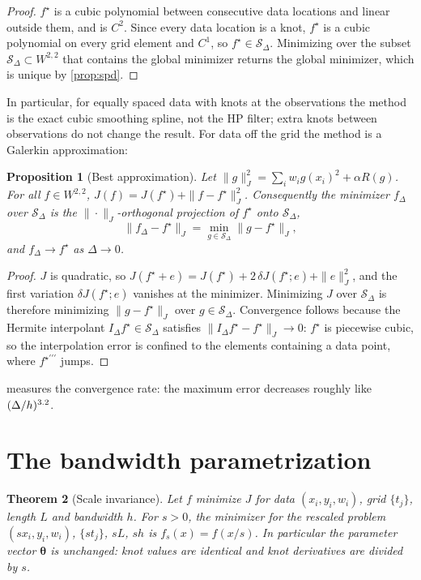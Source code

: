 \documentclass[11pt,a4paper]{article}
\newtheorem{theorem}{Theorem}
\newtheorem{proposition}[theorem]{Proposition}
\theoremstyle{definition}
\theoremstyle{remark}
\newcommand{\vth}{\boldsymbol{\theta}}
\newcommand{\Sd}{\mathcal{S}_\Delta}
\begin{document}
\begin{proof}
$f^\star$ is a cubic polynomial between consecutive data locations and linear outside them, and is $C^2$. Since every data location is a knot, $f^\star$ is a cubic polynomial on every grid element and $C^1$, so $f^\star\in\Sd$. Minimizing over the subset $\Sd\subset W^{2,2}$ that contains the global minimizer returns the global minimizer, which is unique by \cref{prop:spd}.
\end{proof}

In particular, for equally spaced data with knots at the observations the method is the exact cubic smoothing spline, not the HP filter; extra knots between observations do not change the result. For data off the grid the method is a Galerkin approximation:

\begin{proposition}[Best approximation]
\label{prop:galerkin}
Let $\|g\|_J^2=\sum_iw_ig(x_i)^2+\alpha R(g)$. For all $f\in W^{2,2}$, $J(f)=J(f^\star)+\|f-f^\star\|_J^2$. Consequently the minimizer $f_\Delta$ over $\Sd$ is the $\|\cdot\|_J$-orthogonal projection of $f^\star$ onto $\Sd$,
\[
\|f_\Delta-f^\star\|_J=\min_{g\in\Sd}\|g-f^\star\|_J ,
\]
and $f_\Delta\to f^\star$ as $\Delta\to 0$.
\end{proposition}

\begin{proof}
$J$ is quadratic, so $J(f^\star+e)=J(f^\star)+2\,\delta J(f^\star;e)+\|e\|_J^2$, and the first variation $\delta J(f^\star;e)$ vanishes at the minimizer. Minimizing $J$ over $\Sd$ is therefore minimizing $\|g-f^\star\|_J$ over $g\in\Sd$. Convergence follows because the Hermite interpolant $I_\Delta f^\star\in\Sd$ satisfies $\|I_\Delta f^\star-f^\star\|_J\to 0$: $f^\star$ is piecewise cubic, so the interpolation error is confined to the elements containing a data point, where $f^{\star\prime\prime\prime}$ jumps.
\end{proof}

 measures the convergence rate: the maximum error decreases roughly like $(\Delta/h)^{3.2}$.

\section{The bandwidth parametrization}
\label{sec:bandwidth}

\begin{theorem}[Scale invariance]
\label{thm:scale}
Let $f$ minimize $J$ for data $(x_i,y_i,w_i)$, grid $\{t_j\}$, length $L$ and bandwidth $h$. For $s>0$, the minimizer for the rescaled problem $(s x_i,y_i,w_i)$, $\{s t_j\}$, $sL$, $s h$ is $f_s(x)=f(x/s)$. In particular the parameter vector $\vth$ is unchanged: knot values are identical and knot derivatives are divided by $s$.
\end{theorem}
\end{document}
